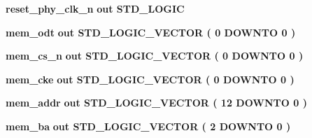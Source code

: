 \begin{DoxyCompactItemize}
\item 
{\bf reset\+\_\+phy\+\_\+clk\+\_\+n}  {\bfseries {\bfseries \textcolor{keywordflow}{out}\textcolor{vhdlchar}{ }}} {\bfseries \textcolor{comment}{S\+T\+D\+\_\+\+L\+O\+G\+IC}\textcolor{vhdlchar}{ }} 
\item 
{\bf mem\+\_\+odt}  {\bfseries {\bfseries \textcolor{keywordflow}{out}\textcolor{vhdlchar}{ }}} {\bfseries \textcolor{comment}{S\+T\+D\+\_\+\+L\+O\+G\+I\+C\+\_\+\+V\+E\+C\+T\+OR}\textcolor{vhdlchar}{ }\textcolor{vhdlchar}{(}\textcolor{vhdlchar}{ }\textcolor{vhdlchar}{ } \textcolor{vhdldigit}{0} \textcolor{vhdlchar}{ }\textcolor{keywordflow}{D\+O\+W\+N\+TO}\textcolor{vhdlchar}{ }\textcolor{vhdlchar}{ } \textcolor{vhdldigit}{0} \textcolor{vhdlchar}{ }\textcolor{vhdlchar}{)}\textcolor{vhdlchar}{ }} 
\item 
{\bf mem\+\_\+cs\+\_\+n}  {\bfseries {\bfseries \textcolor{keywordflow}{out}\textcolor{vhdlchar}{ }}} {\bfseries \textcolor{comment}{S\+T\+D\+\_\+\+L\+O\+G\+I\+C\+\_\+\+V\+E\+C\+T\+OR}\textcolor{vhdlchar}{ }\textcolor{vhdlchar}{(}\textcolor{vhdlchar}{ }\textcolor{vhdlchar}{ } \textcolor{vhdldigit}{0} \textcolor{vhdlchar}{ }\textcolor{keywordflow}{D\+O\+W\+N\+TO}\textcolor{vhdlchar}{ }\textcolor{vhdlchar}{ } \textcolor{vhdldigit}{0} \textcolor{vhdlchar}{ }\textcolor{vhdlchar}{)}\textcolor{vhdlchar}{ }} 
\item 
{\bf mem\+\_\+cke}  {\bfseries {\bfseries \textcolor{keywordflow}{out}\textcolor{vhdlchar}{ }}} {\bfseries \textcolor{comment}{S\+T\+D\+\_\+\+L\+O\+G\+I\+C\+\_\+\+V\+E\+C\+T\+OR}\textcolor{vhdlchar}{ }\textcolor{vhdlchar}{(}\textcolor{vhdlchar}{ }\textcolor{vhdlchar}{ } \textcolor{vhdldigit}{0} \textcolor{vhdlchar}{ }\textcolor{keywordflow}{D\+O\+W\+N\+TO}\textcolor{vhdlchar}{ }\textcolor{vhdlchar}{ } \textcolor{vhdldigit}{0} \textcolor{vhdlchar}{ }\textcolor{vhdlchar}{)}\textcolor{vhdlchar}{ }} 
\item 
{\bf mem\+\_\+addr}  {\bfseries {\bfseries \textcolor{keywordflow}{out}\textcolor{vhdlchar}{ }}} {\bfseries \textcolor{comment}{S\+T\+D\+\_\+\+L\+O\+G\+I\+C\+\_\+\+V\+E\+C\+T\+OR}\textcolor{vhdlchar}{ }\textcolor{vhdlchar}{(}\textcolor{vhdlchar}{ }\textcolor{vhdlchar}{ } \textcolor{vhdldigit}{12} \textcolor{vhdlchar}{ }\textcolor{keywordflow}{D\+O\+W\+N\+TO}\textcolor{vhdlchar}{ }\textcolor{vhdlchar}{ } \textcolor{vhdldigit}{0} \textcolor{vhdlchar}{ }\textcolor{vhdlchar}{)}\textcolor{vhdlchar}{ }} 
\item 
{\bf mem\+\_\+ba}  {\bfseries {\bfseries \textcolor{keywordflow}{out}\textcolor{vhdlchar}{ }}} {\bfseries \textcolor{comment}{S\+T\+D\+\_\+\+L\+O\+G\+I\+C\+\_\+\+V\+E\+C\+T\+OR}\textcolor{vhdlchar}{ }\textcolor{vhdlchar}{(}\textcolor{vhdlchar}{ }\textcolor{vhdlchar}{ } \textcolor{vhdldigit}{2} \textcolor{vhdlchar}{ }\textcolor{keywordflow}{D\+O\+W\+N\+TO}\textcolor{vhdlchar}{ }\textcolor{vhdlchar}{ } \textcolor{vhdldigit}{0} \textcolor{vhdlchar}{ }\textcolor{vhdlchar}{)}\textcolor{vhdlchar}{ }} 

\end{DoxyCompactItemize}
